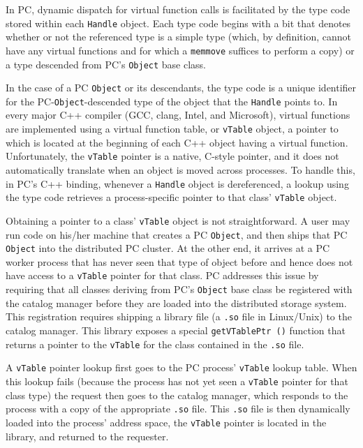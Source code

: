 In PC, dynamic dispatch for virtual function calls is facilitated by the type code stored within each
\texttt{Handle} object.
Each type code begins with a bit that denotes whether or not the referenced type is a simple type (which, by definition, cannot have any
virtual functions and for which a \texttt{memmove} suffices to perform a copy) or a type descended from PC's \texttt{Object} base class.

In the case of a PC \texttt{Object} or its descendants, the
type code is a unique identifier for the PC-\texttt{Object}-descended type of the object that the \texttt{Handle} points to.
In every major C++ compiler (GCC, clang, Intel, and Microsoft), virtual functions
are implemented using a virtual function table, or \texttt{vTable} object, a pointer to which is located at the beginning
of each C++ object having a virtual function.  Unfortunately, the
\texttt{vTable} pointer is a native, C-style pointer, and it does not automatically translate when an
object is moved across processes.  To handle this, in
PC's C++ binding, whenever a \texttt{Handle} object is dereferenced, 
a lookup using the
type code retrieves a process-specific pointer to that class' \texttt{vTable} object.

Obtaining a pointer to a class' \texttt{vTable} object is not straightforward.
A user may run code on his/her machine that creates
a PC \texttt{Object}, and then ships that PC \texttt{Object} into the distributed
PC cluster.  At the other end, it arrives at a PC worker process that has never seen that type of object before and hence
does not have access to a \texttt{vTable} pointer for that class.
PC addresses this issue by requiring that all classes deriving from PC's \texttt{Object} base class be registered with the catalog
manager before they are loaded into the distributed storage system.  This registration requires shipping a library file (a \texttt{.so} file in Linux/Unix) to
the catalog manager.  This library exposes a special \texttt{getVTablePtr ()} function that returns a pointer to the \texttt{vTable} for the class contained
in the \texttt{.so} file.

A \texttt{vTable} pointer lookup first goes to the PC process' \texttt{vTable} lookup table.  When this 
lookup fails (because the process has not yet seen a \texttt{vTable} pointer for that class
type) the request then goes to the catalog manager, which responds to the process with a copy of the appropriate \texttt{.so} file.  This 
\texttt{.so} file is then 
dynamically loaded into the process' address space, the \texttt{vTable} pointer is located in the library,
and returned to the requester.

